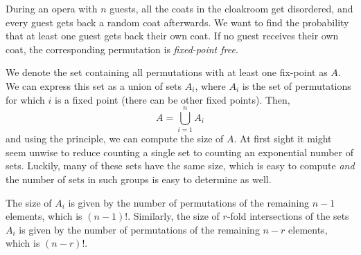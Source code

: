 \begin{example}[Opera]\label{ex:opera}
During an opera with $n$ guests, all the coats in the cloakroom get disordered, and every guest gets back a random coat afterwards.
We want to find the probability that at least one guest gets back their own coat.
If no guest receives their own coat, the corresponding permutation is \emph{fixed-point free}.

We denote the set containing all permutations with at least one fix-point as $A$.
We can express this set as a union of sets $A_i$, where $A_i$ is the set of permutations for which $i$ is a fixed point (there can be other fixed points). 
Then,
\[
A = \bigcup_{i=1}^{n} A_i
\]
and using the  principle, we can compute the size of $A$.
At first sight it might seem unwise to reduce counting a single set to counting an exponential number of sets.
Luckily, many of these sets have the same size, which is easy to compute \emph{and} the number of sets in such groups is easy to determine as well.

The size of $A_i$ is given by the number of permutations of the remaining $n-1$ elements, which is $(n-1)!$.
Similarly, the size of $r$-fold intersections of the sets $A_i$ is given by the number of permutations of the remaining $n-r$ elements, which is $(n-r)!$.


\end{example}
